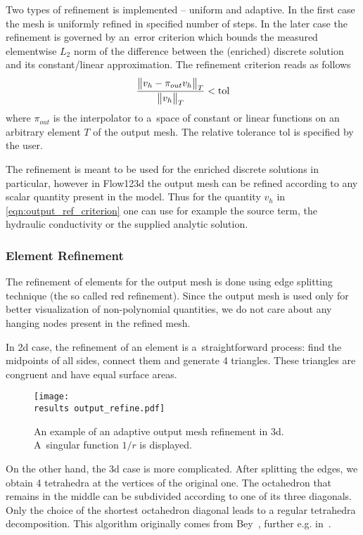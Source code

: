 Two types of refinement is implemented -- uniform and adaptive. In the first case the mesh is uniformly refined in
specified number of steps. In the later case the refinement is governed by an~error criterion which bounds 
the measured elementwise $L_2$ norm of the difference between the (enriched) discrete solution and its constant/linear approximation.
The refinement criterion reads as follows
\begin{equation} \label{eqn:output_ref_criterion}
    \frac{\bigl\Vert v_h - \pi_{out}v_h\bigr\Vert_{T}}{\bigl\Vert v_h\bigr\Vert_{T}} < \textrm{tol}
\end{equation}
where $\pi_{out}$ is the interpolator to a~space of constant or linear functions on an arbitrary element $T$ of the output mesh.
The relative tolerance $\textrm{tol}$ is specified by the user.

The refinement is meant to be used for the enriched discrete solutions in particular, however in Flow123d the output mesh can be refined
according to any scalar quantity present in the model. Thus for the quantity $v_h$ in \eqref{eqn:output_ref_criterion} one can use
for example the source term, the hydraulic conductivity or the supplied analytic solution.

\subsubsection{Element Refinement}
\label{sec:element_refinement}
The refinement of elements for the output mesh is done using edge splitting technique (the so called red refinement).
Since the output mesh is used only for better visualization of non-polynomial quantities, we do not
care about any hanging nodes present in the refined mesh.

In 2d case, the refinement of an element is a~straightforward process: find the midpoints of all sides, connect them and generate 4 triangles.
These triangles are congruent and have equal surface areas.
%
\begin{figure}[!htb]
    \centering    
    \texttt{[image: \\results output\_refine.pdf]} 
    \caption[Output mesh refinement.]
  {An example of an adaptive output mesh refinement in 3d.
  A~singular function $1/r$ is displayed.}
  \label{fig:output_refinement_flow123d}
\end{figure}
%
On the other hand, the 3d case is more complicated. After splitting the edges, we obtain 4 tetrahedra at the vertices
of the original one. The octahedron that remains in the middle can be subdivided according to one of its three diagonals.
Only the choice of the shortest octahedron diagonal leads to a regular tetrahedra decomposition.
This algorithm originally comes from Bey~\cite{bey_2000}, further e.g. in~\cite{brandts_2011}.


